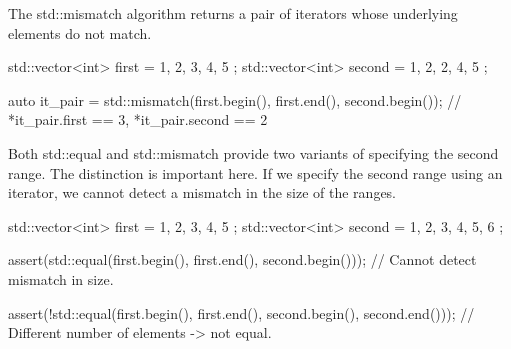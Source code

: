 The std::mismatch algorithm returns a pair of iterators whose underlying elements do not match.

\begin{box-note}
\begin{cppcode}
std::vector<int> first = { 1, 2, 3, 4, 5 };
std::vector<int> second = { 1, 2, 2, 4, 5 };

auto it_pair = std::mismatch(first.begin(), first.end(), second.begin());
// *it_pair.first == 3, *it_pair.second == 2
\end{cppcode}
\end{box-note}

Both std::equal and std::mismatch provide two variants of specifying the second range. The distinction is important here. If we specify the second range using an iterator, we cannot detect a mismatch in the size of the ranges.

\begin{box-note}
\begin{cppcode}
std::vector<int> first = { 1, 2, 3, 4, 5 };
std::vector<int> second = { 1, 2, 3, 4, 5, 6 };

assert(std::equal(first.begin(), first.end(), 
                  second.begin()));
// Cannot detect mismatch in size.

assert(!std::equal(first.begin(), first.end(), 
                   second.begin(), second.end()));
// Different number of elements -> not equal.
\end{cppcode}
\end{box-note}